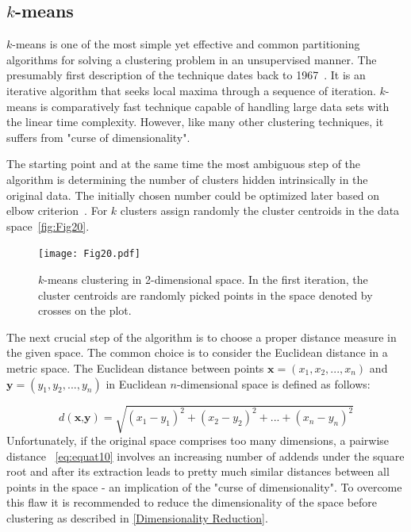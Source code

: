 \subsection{$k$-means}
\label{k-means}
$k$-means is one of the most simple yet effective and common partitioning algorithms for solving a clustering problem in an unsupervised manner. The presumably first description of the technique dates back to 1967~\cite{k-maens1967}. It is an iterative algorithm that seeks local maxima through a sequence of iteration. $k$-means is comparatively fast technique capable of handling large data sets with the linear time complexity. However, like many other clustering techniques, it suffers from "curse of dimensionality".

The starting point and at the same time the most ambiguous step of the algorithm is determining the number of clusters hidden intrinsically in the original data. The initially chosen number could be optimized later based on elbow criterion~\cite{ElbowMethod2014}. For $k$ clusters assign randomly the cluster centroids in the data space~\autoref{fig:Fig20}.
\begin{figure}[H]
    \centering
    \texttt{[image: Fig20.pdf]}
    \caption{$k$-means clustering in 2-dimensional space. In the first iteration, the cluster centroids are randomly picked points in the space denoted by crosses on the plot.}
    \label{fig:Fig20}
\end{figure}
The next crucial step of the algorithm is to choose a proper distance measure in the given space. The common choice is to consider the Euclidean distance in a metric space. The Euclidean distance between points $\textbf{x}=(x_1,x_2,...,x_n)$ and $\textbf{y}=(y_1,y_2,...,y_n)$ in Euclidean $n$-dimensional space is defined as follows:

\begin{equation}
  d(\textbf{x,y})=\sqrt{(x_1-y_1)^2+(x_2-y_2)^2+...+(x_n-y_n)^2}
  \label{eq:equat14}
\end{equation}
Unfortunately, if the original space comprises too many dimensions, a pairwise distance ~\autoref{eq:equat10} involves an increasing number of addends under the square root and after its extraction leads to pretty much similar distances between all points in the space - an implication of the "curse of dimensionality". To overcome this flaw it is recommended to reduce the dimensionality of the space before clustering as described in \ref{Dimensionality Reduction}.

